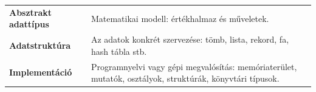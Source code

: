 \begin{tabularx}{\textwidth}{>{\bfseries}lX}
Absztrakt adattípus & Matematikai modell: értékhalmaz és műveletek. \\
Adatstruktúra & Az adatok konkrét szervezése: tömb, lista, rekord, fa, hash tábla stb. \\
Implementáció & Programnyelvi vagy gépi megvalósítás: memóriaterület, mutatók, osztályok, struktúrák, könyvtári típusok. \\
\end{tabularx}
